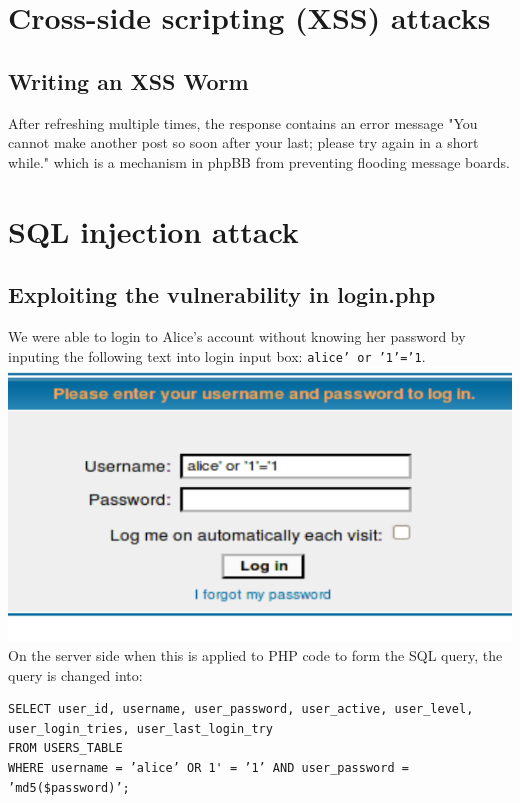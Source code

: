 \documentclass[12pt, a4paper, pdflatex]{article}
\begin{document}
\section{Cross-side scripting (XSS) attacks}

\subsection{Writing an XSS Worm}

After refreshing multiple times, the response contains an error message "You cannot make another post so soon after your last; please try again in a short while." which is a mechanism in phpBB from preventing flooding message boards.


\section{SQL injection attack}

\subsection{Exploiting the vulnerability in login.php}

We were able to login to Alice's account without knowing her password by inputing the following
text into login input box: \texttt{alice' or '1'='1}.\\
\includegraphics[width=.95\textwidth]{gfx/sql/login.png}\\ On the server side when this is applied
to PHP code to form the SQL query, the query is changed into:

\lstset{
  captionpos=b,
  frame=single,
  language=SQL,
  breaklines=true,
  label=sql1
}
\begin{lstlisting}
SELECT user_id, username, user_password, user_active, user_level,
user_login_tries, user_last_login_try
FROM USERS_TABLE
WHERE username = ’alice’ OR 1' = ’1’ AND user_password = ’md5($password)’;
\end{lstlisting}
\end{document}
